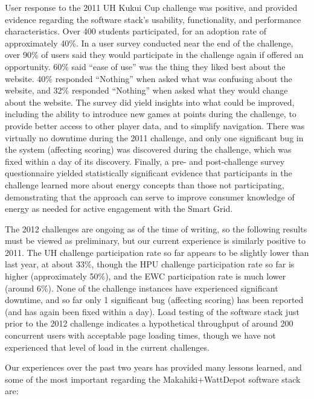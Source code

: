 User response to the 2011 UH Kukui Cup challenge was positive, and provided evidence regarding the software stack's usability, functionality, and performance characteristics.   Over 400 students participated, for an adoption rate of approximately 40\%.  In a user survey conducted near the end of the challenge, over 90\% of users said they would participate in the challenge again if offered an opportunity.  60\%  said ``ease of use'' was the thing they liked best about the website.  40\% responded ``Nothing'' when asked what was confusing about the website, and 32\% responded ``Nothing'' when asked what they would change about the website.  The survey did yield insights into what could be improved, including the ability to introduce new games at points during the challenge, to provide better access to other player data, and to simplify navigation.  There was virtually no downtime during the 2011 challenge, and only one significant bug in the system (affecting scoring) was discovered during the challenge, which was fixed within a day of its discovery.  Finally, a pre- and post-challenge survey questionnaire yielded statistically significant evidence that participants in the challenge learned more about energy concepts than those not participating, demonstrating that the approach can serve to improve consumer knowledge of energy as needed for active engagement with the Smart Grid.

The 2012 challenges are ongoing as of the time of writing, so the following results must be viewed as preliminary, but our current experience is similarly positive to 2011.  The UH challenge participation rate so far appears to be slightly lower than last year, at about 33\%, though the HPU challenge participation rate so far is higher (approximately 50\%), and the EWC participation rate is much lower (around 6\%). None of the challenge instances have experienced significant downtime, and so far only 1 significant bug (affecting scoring) has been reported (and has again been fixed within a day).  Load testing of the software stack just prior to the 2012 challenge indicates a hypothetical throughput of around 200 concurrent users with acceptable page loading times, though we have not experienced that level of load in the current challenges. 

Our experiences over the past two years has provided many lessons learned, and some of the most important regarding the Makahiki+WattDepot software stack are:

